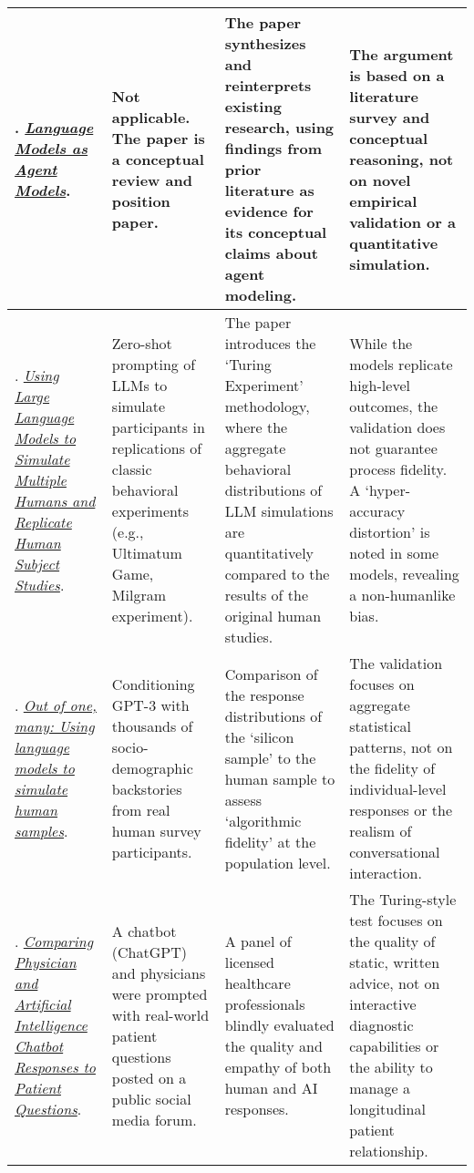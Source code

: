 {\begin{longtable}{| L{4.5cm} | L{3.5cm} | L{3.5cm} | L{3.5cm} |}
\citet{andreas-2022-language}. \href{https://aclanthology.org/2022.findings-emnlp.423/}{\textit{Language Models as Agent Models}}. & Not applicable. The paper is a conceptual review and position paper. & The paper synthesizes and reinterprets existing research, using findings from prior literature as evidence for its conceptual claims about agent modeling. & The argument is based on a literature survey and conceptual reasoning, not on novel empirical validation or a quantitative simulation.
\\\hline
\citet{aher2023}. \href{https://proceedings.mlr.press/v202/aher23a.html}{\textit{Using Large Language Models to Simulate Multiple Humans and Replicate Human Subject Studies}}. & Zero-shot prompting of LLMs to simulate participants in replications of classic behavioral experiments (e.g., Ultimatum Game, Milgram experiment). & The paper introduces the `Turing Experiment' methodology, where the aggregate behavioral distributions of LLM simulations are quantitatively compared to the results of the original human studies. & While the models replicate high-level outcomes, the validation does not guarantee process fidelity. A `hyper-accuracy distortion' is noted in some models, revealing a non-humanlike bias.
\\\hline
\citet{argyle2023}. \href{https://doi.org/10.1017/pan.2023.2}{\textit{Out of one, many: Using language models to simulate human samples}}. & Conditioning GPT-3 with thousands of socio-demographic backstories from real human survey participants. & Comparison of the response distributions of the `silicon sample' to the human sample to assess `algorithmic fidelity' at the population level. & The validation focuses on aggregate statistical patterns, not on the fidelity of individual-level responses or the realism of conversational interaction.
\\\hline
\citet{ayers2023social}. \href{https://jamanetwork.com/journals/jamainternalmedicine/fullarticle/2804309}{\textit{Comparing Physician and Artificial Intelligence Chatbot Responses to Patient Questions}}. & A chatbot (ChatGPT) and physicians were prompted with real-world patient questions posted on a public social media forum. & A panel of licensed healthcare professionals blindly evaluated the quality and empathy of both human and AI responses. & The Turing-style test focuses on the quality of static, written advice, not on interactive diagnostic capabilities or the ability to manage a longitudinal patient relationship.
\\\hline

\end{longtable}}
